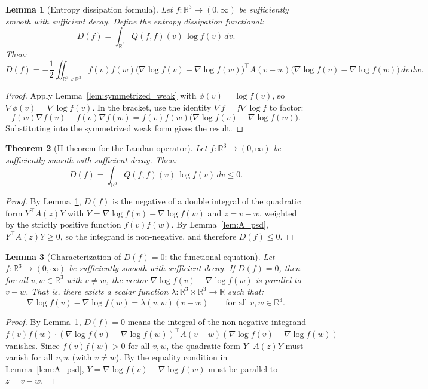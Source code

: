 \documentclass[11pt]{article}
\newcommand{\R}{\mathbb{R}}
\newtheorem{theorem}{Theorem}
\newtheorem{lemma}[theorem]{Lemma}
\begin{document}
\begin{lemma}[Entropy dissipation formula]
\label{lem:entropy_dissipation}
Let $f : \R^3 \to (0, \infty)$ be sufficiently smooth with sufficient decay. Define the \emph{entropy dissipation functional}:
\[
D(f) = \int_{\R^3} Q(f, f)(v) \, \log f(v) \, dv.
\]
Then:
\[
D(f) = -\frac{1}{2} \iint_{\R^3 \times \R^3} f(v) f(w) \big(\nabla \log f(v) - \nabla \log f(w)\big)^\top A(v-w) \big(\nabla \log f(v) - \nabla \log f(w)\big) \, dv \, dw.
\]
\end{lemma}

\begin{proof}
Apply Lemma~\ref{lem:symmetrized_weak} with $\phi(v) = \log f(v)$, so $\nabla \phi(v) = \nabla \log f(v)$. In the bracket, use the identity $\nabla f = f \nabla \log f$ to factor:
\[
f(w) \nabla f(v) - f(v) \nabla f(w) = f(v) f(w) \big(\nabla \log f(v) - \nabla \log f(w)\big).
\]
Substituting into the symmetrized weak form gives the result.
\end{proof}

\begin{theorem}[H-theorem for the Landau operator]
\label{thm:H_theorem}
Let $f : \R^3 \to (0, \infty)$ be sufficiently smooth with sufficient decay. Then:
\[
D(f) = \int_{\R^3} Q(f, f)(v) \, \log f(v) \, dv \leq 0.
\]
\end{theorem}

\begin{proof}
By Lemma~\ref{lem:entropy_dissipation}, $D(f)$ is the negative of a double integral of the quadratic form $Y^\top A(z) Y$ with $Y = \nabla \log f(v) - \nabla \log f(w)$ and $z = v - w$, weighted by the strictly positive function $f(v) f(w)$. By Lemma~\ref{lem:A_psd}, $Y^\top A(z) Y \geq 0$, so the integrand is non-negative, and therefore $D(f) \leq 0$.
\end{proof}

\begin{lemma}[Characterization of $D(f) = 0$: the functional equation]
\label{lem:D_zero_functional_eq}
Let $f : \R^3 \to (0, \infty)$ be sufficiently smooth with sufficient decay. If $D(f) = 0$, then for all $v, w \in \R^3$ with $v \neq w$, the vector $\nabla \log f(v) - \nabla \log f(w)$ is parallel to $v - w$. That is, there exists a scalar function $\lambda : \R^3 \times \R^3 \to \R$ such that:
\[
\nabla \log f(v) - \nabla \log f(w) = \lambda(v, w)(v - w) \qquad \text{for all } v, w \in \R^3.
\]
\end{lemma}

\begin{proof}
By Lemma~\ref{lem:entropy_dissipation}, $D(f) = 0$ means the integral of the non-negative integrand $f(v)f(w) \cdot (\nabla \log f(v) - \nabla \log f(w))^\top A(v-w) (\nabla \log f(v) - \nabla \log f(w))$ vanishes. Since $f(v)f(w) > 0$ for all $v, w$, the quadratic form $Y^\top A(z) Y$ must vanish for all $v, w$ (with $v \neq w$). By the equality condition in Lemma~\ref{lem:A_psd}, $Y = \nabla \log f(v) - \nabla \log f(w)$ must be parallel to $z = v - w$.
\end{proof}
\end{document}
